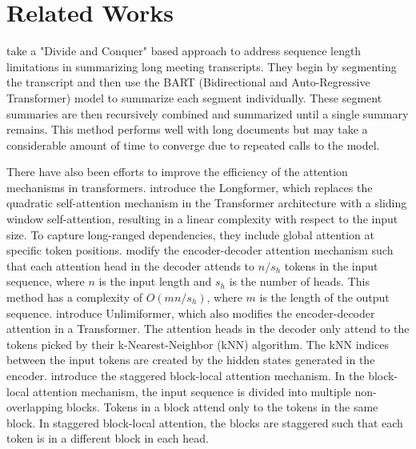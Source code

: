 \section{Related Works}
	\label{sec:related-works}

	\citet{golia2024action} take a "Divide and Conquer" based approach to address sequence length
	limitations in summarizing long meeting transcripts.
	They begin by segmenting the transcript and then use the BART (Bidirectional and Auto-Regressive
	Transformer) model to summarize each segment individually.
	These segment summaries are then recursively combined and summarized until a single summary
	remains.
	This method performs well with long documents but may take a considerable amount of time to
	converge due to repeated calls to the model.

	There have also been efforts to improve the efficiency of the attention mechanisms in transformers.
	\citet{beltagy2020longformer} introduce the Longformer, which replaces the quadratic self-attention
	mechanism in the Transformer architecture with a sliding window self-attention, resulting in a
	linear complexity with respect to the input size.
	To capture long-ranged dependencies, they include global attention at specific token positions.
	\citet{huang-etal-2021-efficient} modify the encoder-decoder attention mechanism such that each
	attention head in the decoder attends to $n/s_h$ tokens in the input sequence, where $n$ is the input
	length and $s_h$ is the number of heads.
	This method has a complexity of $O(mn/s_h)$, where $m$ is the length of the output sequence.
	\citet{bertsch2023unlimiformer} introduce Unlimiformer, which also modifies the encoder-decoder
	attention in a Transformer.
	The attention heads in the decoder only attend to the tokens picked by their k-Nearest-Neighbor (kNN)
	algorithm.
	The kNN indices between the input tokens are created by the hidden states generated in the encoder.
	\citet{phang2022investigating} introduce the staggered block-local attention mechanism.
	In the block-local attention mechanism, the input sequence is divided into multiple non-overlapping
	blocks.
	Tokens in a block attend only to the tokens in the same block.
	In staggered block-local attention, the blocks are staggered such that each token is in a different
	block in each head.

